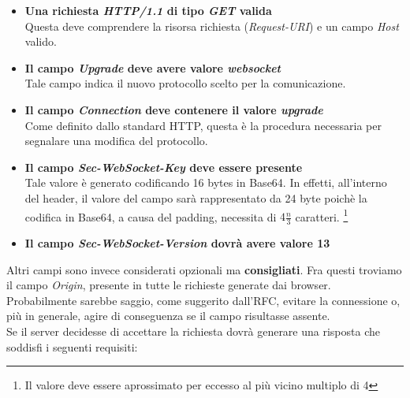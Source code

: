 \documentclass[
  oneside,
  11pt, a4paper,
  footinclude=true,
  headinclude=true,
  cleardoublepage=empty
]{scrbook}
\begin{document}
\begin{itemize}
  \item \textbf{Una richiesta \textit{HTTP/1.1} di tipo \textit{GET} valida}\\
  Questa deve comprendere la risorsa richiesta (\textit{Request-URI}) e un campo \textit{Host} valido.
  \item \textbf{Il campo \textit{Upgrade} deve avere valore \textit{websocket}}\\
  Tale campo indica il nuovo protocollo scelto per la comunicazione.
  \item \textbf{Il campo \textit{Connection} deve contenere il valore \textit{upgrade}}\\
  Come definito dallo standard HTTP, questa è la procedura necessaria per segnalare una modifica del protocollo.
  
  \item \textbf{Il campo \textit{Sec-WebSocket-Key} deve essere presente}\\
  Tale valore è generato codificando 16 bytes in Base64.
  In effetti, all'interno del header, il valore del campo sarà rappresentato da 24 byte poichè la codifica in Base64, a causa del padding, necessita di $4\frac{n}{3}$ caratteri.
  \footnote{Il valore deve essere aprossimato per eccesso al più vicino multiplo di 4}
  \item \textbf{Il campo \textit{Sec-WebSocket-Version} dovrà avere valore 13}
\end{itemize}
Altri campi sono invece considerati opzionali ma \textbf{consigliati}.
Fra questi troviamo il campo \textit{Origin}, presente in tutte le richieste generate dai browser.
Probabilmente sarebbe saggio, come suggerito dall'RFC, evitare la connessione o, più in generale, agire di conseguenza se il campo risultasse assente.\\
Se il server decidesse di accettare la richiesta dovrà generare una risposta che soddisfi i seguenti requisiti:
\end{document}
